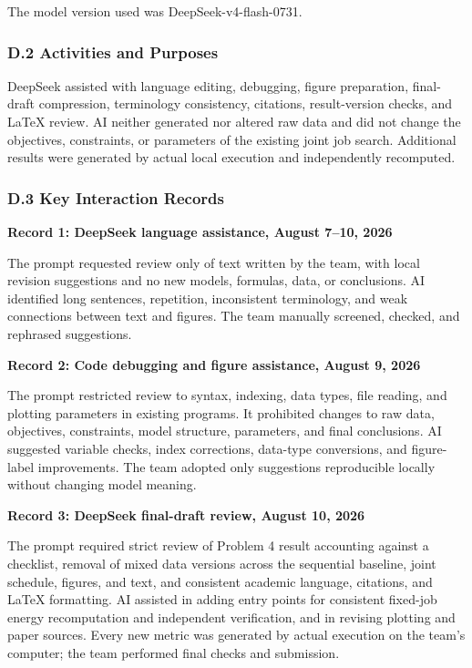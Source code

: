 The model version used was DeepSeek-v4-flash-0731.

\subsubsection*{D.2 Activities and Purposes}

DeepSeek assisted with language editing, debugging, figure preparation, final-draft compression, terminology consistency, citations, result-version checks, and LaTeX review. AI neither generated nor altered raw data and did not change the objectives, constraints, or parameters of the existing joint job search. Additional results were generated by actual local execution and independently recomputed.

\subsubsection*{D.3 Key Interaction Records}

\noindent\textbf{Record 1: DeepSeek language assistance, August 7--10, 2026}

The prompt requested review only of text written by the team, with local revision suggestions and no new models, formulas, data, or conclusions. AI identified long sentences, repetition, inconsistent terminology, and weak connections between text and figures. The team manually screened, checked, and rephrased suggestions.

\noindent\textbf{Record 2: Code debugging and figure assistance, August 9, 2026}

The prompt restricted review to syntax, indexing, data types, file reading, and plotting parameters in existing programs. It prohibited changes to raw data, objectives, constraints, model structure, parameters, and final conclusions. AI suggested variable checks, index corrections, data-type conversions, and figure-label improvements. The team adopted only suggestions reproducible locally without changing model meaning.

\noindent\textbf{Record 3: DeepSeek final-draft review, August 10, 2026}

The prompt required strict review of Problem 4 result accounting against a checklist, removal of mixed data versions across the sequential baseline, joint schedule, figures, and text, and consistent academic language, citations, and LaTeX formatting. AI assisted in adding entry points for consistent fixed-job energy recomputation and independent verification, and in revising plotting and paper sources. Every new metric was generated by actual execution on the team's computer; the team performed final checks and submission.

